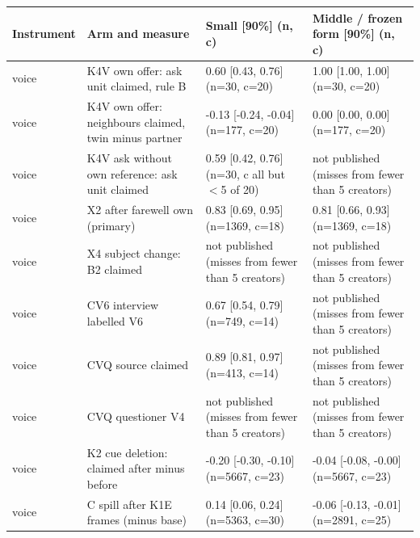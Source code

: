 {\scriptsize\setlength{\tabcolsep}{2.5pt}
\begin{tabular}{@{}lp{}ll@{}}
\toprule
Instrument & Arm and measure & Small [90\%] (n, c) & Middle / frozen form [90\%] (n, c) \\
\midrule
voice & K4V own offer: ask unit claimed, rule B & 0.60 [0.43, 0.76] (n=30, c=20) & 1.00 [1.00, 1.00] (n=30, c=20) \\
voice & K4V own offer: neighbours claimed, twin minus partner & -0.13 [-0.24, -0.04] (n=177, c=20) & 0.00 [0.00, 0.00] (n=177, c=20) \\
voice & K4V ask without own reference: ask unit claimed & 0.59 [0.42, 0.76] (n=30, c all but $<$5 of 20) & not published (misses from fewer than 5 creators) \\
voice & X2 after farewell own (primary) & 0.83 [0.69, 0.95] (n=1369, c=18) & 0.81 [0.66, 0.93] (n=1369, c=18) \\
voice & X4 subject change: B2 claimed & not published (misses from fewer than 5 creators) & not published (misses from fewer than 5 creators) \\
voice & CV6 interview labelled V6 & 0.67 [0.54, 0.79] (n=749, c=14) & not published (misses from fewer than 5 creators) \\
voice & CVQ source claimed & 0.89 [0.81, 0.97] (n=413, c=14) & not published (misses from fewer than 5 creators) \\
voice & CVQ questioner V4 & not published (misses from fewer than 5 creators) & not published (misses from fewer than 5 creators) \\
voice & K2 cue deletion: claimed after minus before & -0.20 [-0.30, -0.10] (n=5667, c=23) & -0.04 [-0.08, -0.00] (n=5667, c=23) \\
voice & C spill after K1E frames (minus base) & 0.14 [0.06, 0.24] (n=5363, c=30) & -0.06 [-0.13, -0.01] (n=2891, c=25) \\

\end{tabular}}
